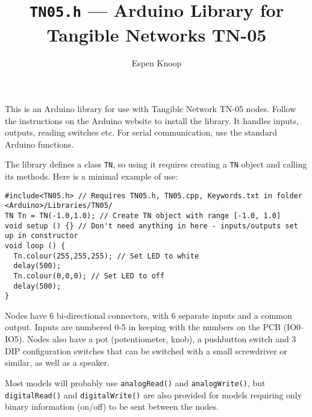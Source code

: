 \documentclass[a4paper,10pt]{article}
\title{\texttt{TN05.h} --- Arduino Library for Tangible Networks TN-05}
\author{Espen Knoop}
\date{}
\begin{document}
\maketitle

This is an Arduino library for use with Tangible Network TN-05 nodes.  Follow the instructions on the Arduino website to install the library.  It handles inputs, outputs, reading switches etc.  For serial communication, use the standard Arduino functions.  

The library defines a class \verb|TN|, so using it requires creating a \verb|TN| object and calling its methods.  Here is a minimal example of use:
\begin{verbatim}
#include<TN05.h> // Requires TN05.h, TN05.cpp, Keywords.txt in folder <Arduino>/Libraries/TN05/
TN Tn = TN(-1.0,1.0); // Create TN object with range [-1.0, 1.0]
void setup () {} // Don't need anything in here - inputs/outputs set up in constructor
void loop () {
  Tn.colour(255,255,255); // Set LED to white
  delay(500);
  Tn.colour(0,0,0); // Set LED to off
  delay(500);
}
\end{verbatim}

Nodes have 6 bi-directional connectors, with 6 separate inputs and a common output.  Inputs are numbered 0-5 in keeping with the numbers on the PCB (IO0--IO5).  Nodes also have a pot (potentiometer, knob), a pushbutton switch and 3 DIP configuration switches that can be switched with a small screwdriver or similar, as well as a speaker.

Most models will probably use \verb|analogRead()| and \verb|analogWrite()|, but \verb|digitalRead()| and \verb|digitalWrite()| are also provided for models requiring only binary information (on/off) to be sent between the nodes.
\end{document}
